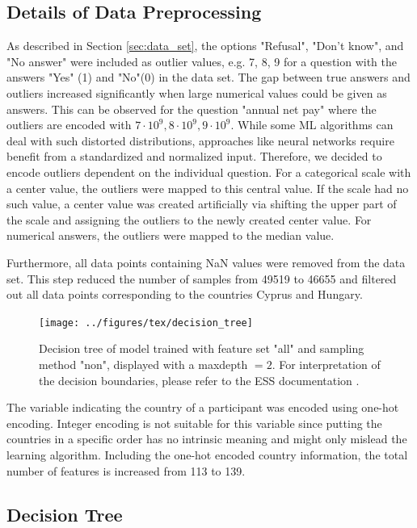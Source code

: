 \documentclass[10pt]{article}
\begin{document}
	\subsection{Details of Data Preprocessing} \label{sec:details_preprocessing}
	As described in Section \ref{sec:data_set}, the options "Refusal", "Don't know", and "No answer" were included as outlier values, e.g. 7, 8, 9 for a question with the answers "Yes" (1) and "No"(0) in the data set. The gap between true answers and outliers increased significantly when large numerical values could be given as answers. This can be observed for the question "annual net pay" where the outliers are encoded with $7 \cdot 10^{9}, 8\cdot 10^{9}, 9 \cdot 10^{9}$. While some ML algorithms can deal with such distorted distributions, approaches like neural networks require benefit from a standardized and normalized input. Therefore, we decided to encode outliers dependent on the individual question. For a categorical scale with a center value, the outliers were mapped to this central value. If the scale had no such value, a center value was created artificially via shifting the upper part of the scale and assigning the outliers to the newly created center value. For numerical answers, the outliers were mapped to the median value.
	
	Furthermore, all data points containing NaN values were removed from the data set. This step reduced the number of samples from 49519 to 46655 and filtered out all data points corresponding to the countries Cyprus and Hungary.
	
	\begin{figure}[t]
		\centering
		\texttt{[image: ../figures/tex/decision\_tree]}
		\caption{Decision tree of model trained with feature set "all" and sampling method "non", displayed with a max\textunderscore depth $= 2$. For interpretation of the decision boundaries, please refer to the ESS documentation \cite{ESS9:2021}.}
		\label{fig:dt}
	\end{figure}
	
	The variable indicating the country of a participant was encoded using one-hot encoding. Integer encoding is not suitable for this variable since putting the countries in a specific order has no intrinsic meaning and might only mislead the learning algorithm. Including the one-hot encoded country information, the total number of features is increased from 113 to 139.
	

	
	
	\subsection{Decision Tree} \label{ssec:dt}
	
\end{document}
